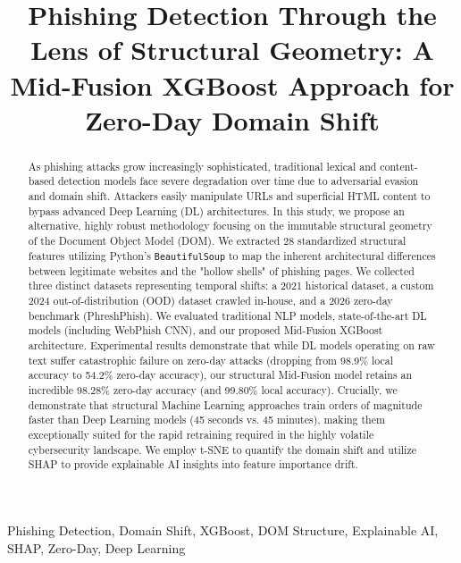 \documentclass[conference]{IEEEtran}
\begin{document}
\title{Phishing Detection Through the Lens of Structural Geometry: A Mid-Fusion XGBoost Approach for Zero-Day Domain Shift}

\author{
}

\maketitle

\begin{abstract}
As phishing attacks grow increasingly sophisticated, traditional lexical and content-based detection models face severe degradation over time due to adversarial evasion and domain shift. Attackers easily manipulate URLs and superficial HTML content to bypass advanced Deep Learning (DL) architectures. In this study, we propose an alternative, highly robust methodology focusing on the immutable structural geometry of the Document Object Model (DOM). We extracted 28 standardized structural features utilizing Python's \texttt{BeautifulSoup} to map the inherent architectural differences between legitimate websites and the "hollow shells" of phishing pages. We collected three distinct datasets representing temporal shifts: a 2021 historical dataset, a custom 2024 out-of-distribution (OOD) dataset crawled in-house, and a 2026 zero-day benchmark (PhreshPhish). We evaluated traditional NLP models, state-of-the-art DL models (including WebPhish CNN), and our proposed Mid-Fusion XGBoost architecture. Experimental results demonstrate that while DL models operating on raw text suffer catastrophic failure on zero-day attacks (dropping from 98.9\% local accuracy to 54.2\% zero-day accuracy), our structural Mid-Fusion model retains an incredible 98.28\% zero-day accuracy (and 99.80\% local accuracy). Crucially, we demonstrate that structural Machine Learning approaches train orders of magnitude faster than Deep Learning models (45 seconds vs. 45 minutes), making them exceptionally suited for the rapid retraining required in the highly volatile cybersecurity landscape. We employ t-SNE to quantify the domain shift and utilize SHAP to provide explainable AI insights into feature importance drift.
\end{abstract}

\begin{IEEEkeywords}
Phishing Detection, Domain Shift, XGBoost, DOM Structure, Explainable AI, SHAP, Zero-Day, Deep Learning
\end{IEEEkeywords}
\end{document}
